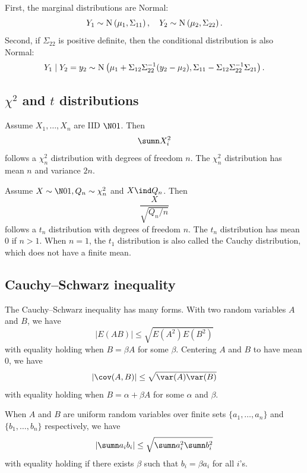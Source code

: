 First, the marginal distributions are Normal:
$$
Y_{1}  \sim\textsc{N}\left(\mu_{1},\Sigma_{11}\right),\quad 
Y_{2}  \sim\textsc{N}\left(\mu_{2},\Sigma_{22}\right).
$$
Second, if $\Sigma_{22}$ is positive definite, then the conditional distribution is also Normal:
\[
Y_{1}\mid Y_{2}=y_{2}\sim\textsc{N}\left(\mu_{1}+\Sigma_{12}\Sigma_{22}^{-1}(y_{2}-\mu_{2}),\Sigma_{11}-\Sigma_{12}\Sigma_{22}^{-1}\Sigma_{21}\right).
\]
 

 
 
 \subsection{$\chi^2$ and $t$ distributions}
\label{subsection::chi2-t-distribution}



Assume $X_1,\ldots, X_n$ are IID $\N01$. Then 
$$
\sumn X_i^2 
$$
follows a $\chi^2_n$ distribution with degrees of freedom $n$. The $\chi^2_n$ distribution has mean $n$ and variance $2n$. 



Assume $X\sim \N01, Q_n\sim \chi^2_n$ and $X\ind Q_n$. Then
$$
\frac{X}{  \sqrt{Q_n / n} }
$$
follows a $t_n$ distribution with degrees of freedom $n$. The $t_n$ distribution has mean 0 if $n>1$. When $n=1$, the $t_1$ distribution is also called the Cauchy distribution, which does not have a finite mean. 







\subsection{Cauchy--Schwarz inequality}\label{sec::cauchy-schwarz-inequality}

 
The  Cauchy--Schwarz inequality has many forms. With two random variables $A$ and $B$, we have
$$
 | E(AB)  | \leq \sqrt{   E(A^2) E(B^2)  }
$$
with equality holding when $B = \beta A$ for some $\beta$. Centering  $A$ and $B$ to have mean 0, we have
$$
| \cov(A, B)  | \leq \sqrt{   \var(A) \var(B)  } 
$$
with equality holding when $B = \alpha + \beta A$ for some $\alpha$ and  $\beta$.

When $A$ and $B$ are uniform random variables over finite sets $\{ a_1, \ldots, a_n \}$ and $\{ b_1, \ldots, b_n \}$ respectively, we have
$$
 \left|  \sumn a_i b_i  \right| \leq \sqrt{  \sumn a_i^2   \sumn b_i^2  }
$$
with equality holding if there exists   $\beta$ such that $b_i =  \beta a_i$ for all $i$'s. 
 

